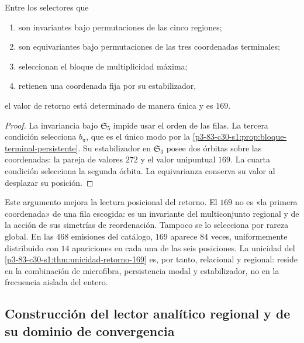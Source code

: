 \begin{theorem}
\label{p3-83-c30-s1:thm:unicidad-retorno-169}
Entre los selectores que
\begin{enumerate}
  \item son invariantes bajo permutaciones de las cinco regiones;
  \item son equivariantes bajo permutaciones de las tres coordenadas
  terminales;
  \item seleccionan el bloque de multiplicidad máxima;
  \item retienen una coordenada fija por su estabilizador,
\end{enumerate}
el valor de retorno está determinado de manera única y es \(169\).
\end{theorem}

\begin{proof}
La invariancia bajo \(\mathfrak S_5\) impide usar el orden de las filas. La
tercera condición selecciona \(b_\pi\), que es el único modo por la
\cref{p3-83-c30-s1:prop:bloque-terminal-persistente}. Su estabilizador en
\(\mathfrak S_3\) posee dos órbitas sobre las coordenadas: la pareja de
valores \(272\) y el valor unipuntual \(169\). La cuarta condición selecciona la
segunda órbita. La equivarianza conserva su valor al desplazar su posición.
\end{proof}

Este argumento mejora la lectura posicional del retorno. El \(169\) no es
«la primera coordenada» de una fila escogida: es un invariante del
multiconjunto regional y de la acción de sus simetrías de reordenación.
Tampoco se lo selecciona por rareza global. En las \(468\) emisiones del
catálogo, \(169\) aparece \(84\) veces, uniformemente distribuido con
\(14\) apariciones en cada una de las seis posiciones. La unicidad del
\cref{p3-83-c30-s1:thm:unicidad-retorno-169} es, por tanto, relacional y regional: reside
en la combinación de microfibra, persistencia modal y estabilizador, no en la
frecuencia aislada del entero.

\subsection{Construcción del lector analítico regional y de su dominio de convergencia}
\label{sec:s102:c38:2:3}


